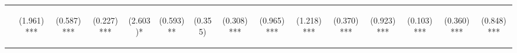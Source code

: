 \begin{center}
\begin{tabular}{lcccccccccccccc}
\hline  & \begin{normalsize}(1.961)***\end{normalsize} & \begin{normalsize}(0.587)***\end{normalsize} & \begin{normalsize}(0.227)***\end{normalsize} & \begin{normalsize}(2.603)*\end{normalsize} & \begin{normalsize}(0.593)**\end{normalsize} & \begin{normalsize}(0.355)\end{normalsize} & \begin{normalsize}(0.308)***\end{normalsize} & \begin{normalsize}(0.965)***\end{normalsize} & \begin{normalsize}(1.218)***\end{normalsize} & \begin{normalsize}(0.370)***\end{normalsize} & \begin{normalsize}(0.923)***\end{normalsize} & \begin{normalsize}(0.103)***\end{normalsize} & \begin{normalsize}(0.360)***\end{normalsize} & \begin{normalsize}(0.848)***\end{normalsize}\\

\end{tabular}
\end{center}
